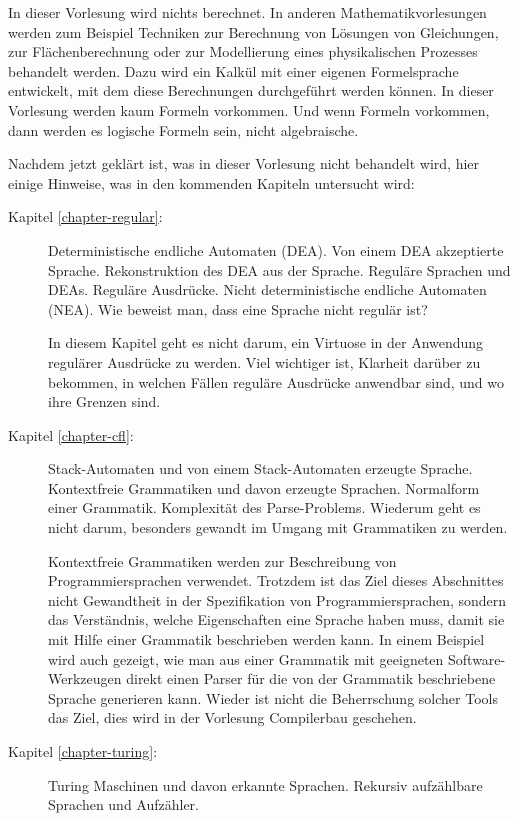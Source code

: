 In dieser Vorlesung wird nichts berechnet.
In anderen
Mathematikvorlesungen werden zum Beispiel Techniken zur Berechnung
von Lösungen von
Gleichungen, zur Flächenberechnung oder zur Modellierung eines 
physikalischen Prozesses behandelt werden.
Dazu wird ein Kalkül mit einer eigenen Formelsprache entwickelt,
mit dem diese Berechnungen durchgeführt werden können.
In dieser Vorlesung werden kaum Formeln vorkommen.
Und wenn Formeln vorkommen, dann werden es logische Formeln sein,
nicht algebraische.

Nachdem jetzt geklärt ist, was in dieser Vorlesung nicht behandelt
wird, hier einige Hinweise, was in den kommenden Kapiteln untersucht
wird:
\begin{description}
\item[Kapitel \ref{chapter-regular}:] Deterministische endliche Automaten (DEA).
Von einem
DEA akzeptierte Sprache.
Rekonstruktion des DEA aus der Sprache.
Reguläre Sprachen und DEAs.
Reguläre Ausdrücke.
Nicht deterministische
endliche Automaten (NEA).
Wie beweist man, dass eine Sprache nicht regulär
ist?

In diesem Kapitel geht es nicht darum, ein Virtuose in der
Anwendung regulärer Ausdrücke zu werden.
Viel wichtiger ist, Klarheit darüber
zu bekommen, in welchen Fällen reguläre Ausdrücke anwendbar sind,
und wo ihre Grenzen sind.

\item[Kapitel \ref{chapter-cfl}:] Stack-Automaten und von einem Stack-Automaten
erzeugte Sprache.
Kontextfreie Grammatiken und davon erzeugte Sprachen.
Normalform einer Grammatik.
Komplexität des Parse-Problems.
Wiederum geht es nicht darum, besonders gewandt im Umgang mit Grammatiken
zu werden.

Kontextfreie Grammatiken werden zur Beschreibung von Programmiersprachen verwendet.
Trotzdem ist das Ziel dieses Abschnittes nicht Gewandtheit in der Spezifikation
von Programmiersprachen, sondern das Verständnis, welche Eigenschaften eine
Sprache haben muss, damit sie mit Hilfe einer Grammatik beschrieben werden kann.
In einem Beispiel wird auch gezeigt, wie man aus einer Grammatik mit geeigneten
Software-Werkzeugen direkt einen Parser für die von der Grammatik beschriebene
Sprache generieren kann.
Wieder ist nicht die Beherrschung solcher Tools das
Ziel, dies wird in der Vorlesung Compilerbau geschehen.

\item[Kapitel \ref{chapter-turing}:] Turing Maschinen und davon erkannte Sprachen.
Rekursiv aufzählbare Sprachen und Aufzähler.


\end{description}
